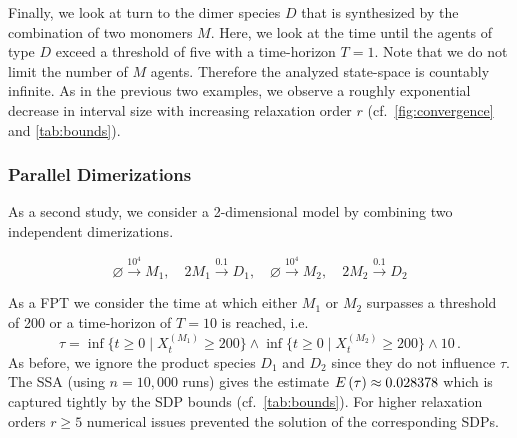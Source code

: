 
Finally, we look at turn to the dimer species $D$ that is synthesized by the combination of
two monomers $M$. Here, we look at the time until the agents of type $D$ exceed a threshold of five
with a time-horizon $T=1$. Note that we do not limit the number of $M$ agents. Therefore
the analyzed state-space is countably infinite. As in the previous two examples, we
observe a roughly exponential decrease in interval size with increasing relaxation
order $r$ (cf.\ \autoref{fig:convergence} and \autoref{tab:bounds}).


\subsubsection{Parallel Dimerizations}
As a second study, we consider a 2-dimensional model by combining two
independent dimerizations.
\begin{model}\label{model:double_dim}
$$\varnothing\xrightarrow{10^4}M_1,\quad 2M_1\xrightarrow{0.1}D_1,\quad \varnothing\xrightarrow{10^4}M_2,\quad 2M_2\xrightarrow{0.1}D_2$$
\end{model}
As a FPT we consider the time at which either $M_1$ or $M_2$ surpasses a threshold of 200 or a time-horizon of $T=10$
is reached, i.e.
$$ \tau=\inf\{t\geq 0\mid X_t^{(M_1)} \geq 200\}\land \inf\{t\geq 0\mid X_t^{(M_2)} \geq 200\}\land 10\,.$$
As before, we ignore the product species $D_1$ and $D_2$ since they do not influence $\tau$.
The SSA   (using $n=10,\!000$ runs) gives the estimate ${E}\left(\tau\right)\approx 0.028378$ %
which is captured tightly by the SDP bounds (cf.\ \autoref{tab:bounds}).
For higher relaxation orders $r \geq 5$  numerical issues prevented the solution of the
corresponding SDPs.

